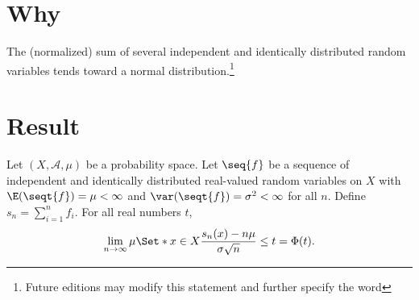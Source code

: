 

\section*{Why}

The (normalized) sum of several independent and identically distributed random variables tends toward a normal distribution.\footnote{Future editions may modify this statement and further specify the word }

\section*{Result}

\begin{proposition}
Let $(X, \mathcal{A} , \mu )$
be a probability space.
Let $\seq{f}$ be a sequence
of independent and identically
distributed real-valued
random variables on $X$
with
$\E (\seqt{f}) = \mu  < \infty$
and
$\var(\seqt{f}) = \sigma ^2 < \infty$
for all $n$.
Define $s_n = \sum_{i = 1}^{n}f_i$.
For all real numbers $t$,
  \[
\lim_{n \to \infty} \mu \Set*{ x \in X }{ \frac{ s_n(x) - n\mu  }{ \sigma \sqrt{n} } \leq t } = \Phi (t).
  \]\end{proposition}
\blankpage